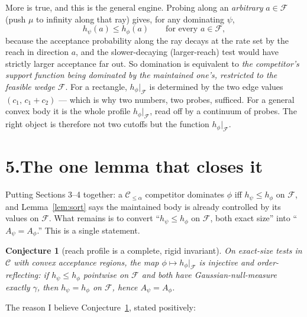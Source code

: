 \documentclass[12pt]{article}
\newtheorem{conjecture}{Conjecture}
\theoremstyle{definition}
\theoremstyle{remark}
\newcommand{\Cclass}{\mathcal C}
\newcommand{\Feas}{\mathcal F}
\begin{document}
More is true, and this is the general engine. Probing along an \emph{arbitrary} $a\in\Feas$ (push $\mu$ to infinity along that ray) gives, for any dominating $\psi$,
\begin{equation}\label{eq:reach-dom}
h_\psi(a)\le h_\phi(a)\qquad\text{for every }a\in\Feas,
\end{equation}
because the acceptance probability along the ray decays at the rate set by the reach in direction $a$, and the slower-decaying (larger-reach) test would have strictly larger acceptance far out. So domination is equivalent to \emph{the competitor's support function being dominated by the maintained one's, restricted to the feasible wedge $\Feas$}. For a rectangle, $h_\phi|_\Feas$ is determined by the two edge values $(c_1,\,c_1+c_2)$ --- which is why two numbers, two probes, sufficed. For a general convex body it is the whole profile $h_\phi|_\Feas$, read off by a continuum of probes. The right object is therefore not two cutoffs but the function $h_\phi|_\Feas$.

\section*{5.\quad The one lemma that closes it}

Putting Sections 3--4 together: a $\Cclass_{\le\alpha}$ competitor dominates $\phi$ iff $h_\psi\le h_\phi$ on $\Feas$, and Lemma~\ref{lem:sort} says the maintained body is already controlled by its values on $\Feas$. What remains is to convert ``$h_\psi\le h_\phi$ on $\Feas$, both exact size'' into ``$A_\psi=A_\phi$.'' This is a single statement.

\begin{conjecture}[reach profile is a complete, rigid invariant]\label{conj:link}
On exact-size tests in $\Cclass$ with convex acceptance regions, the map $\phi\mapsto h_\phi|_\Feas$ is injective and order-reflecting: if $h_\psi\le h_\phi$ pointwise on $\Feas$ and both have Gaussian-null-measure exactly $\gamma$, then $h_\psi=h_\phi$ on $\Feas$, hence $A_\psi=A_\phi$.
\end{conjecture}

The reason I believe Conjecture~\ref{conj:link}, stated positively:
\end{document}
